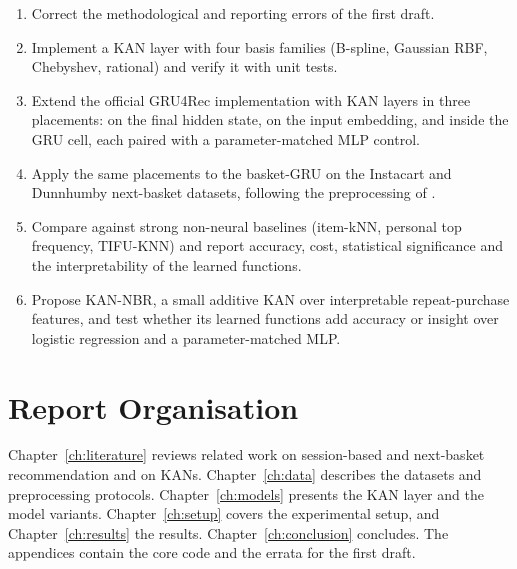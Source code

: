 \begin{enumerate}
    \item Correct the methodological and reporting errors of the first draft.
    \item Implement a KAN layer with four basis families (B-spline, Gaussian RBF,
          Chebyshev, rational) and verify it with unit tests.
    \item Extend the official GRU4Rec implementation with KAN layers in three
          placements: on the final hidden state, on the input embedding, and
          inside the GRU cell, each paired with a parameter-matched MLP control.
    \item Apply the same placements to the basket-GRU on the Instacart and
          Dunnhumby next-basket datasets, following the preprocessing of
          \cite{vanmaasakkers2023}.
    \item Compare against strong non-neural baselines (item-kNN, personal top
          frequency, TIFU-KNN) and report accuracy, cost, statistical
          significance and the interpretability of the learned functions.
    \item Propose KAN-NBR, a small additive KAN over interpretable repeat-purchase
          features, and test whether its learned functions add accuracy or
          insight over logistic regression and a parameter-matched MLP.
\end{enumerate}

\section{Report Organisation}

Chapter~\ref{ch:literature} reviews related work on session-based and
next-basket recommendation and on KANs. Chapter~\ref{ch:data} describes the
datasets and preprocessing protocols. Chapter~\ref{ch:models} presents the KAN
layer and the model variants. Chapter~\ref{ch:setup} covers the experimental
setup, and Chapter~\ref{ch:results} the results. Chapter~\ref{ch:conclusion}
concludes. The appendices contain the core code and the errata for the first
draft.
